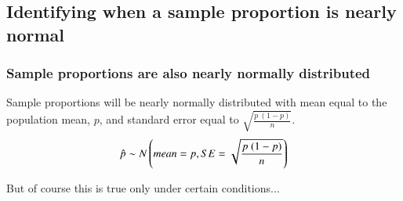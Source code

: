 
\subsection{Identifying when a sample proportion is nearly normal}


\begin{frame}
\frametitle{Sample proportions are also nearly normally distributed}

{
Sample proportions will be nearly normally distributed with mean equal to the population mean, $p$, and standard error equal to $\sqrt{\frac{p~(1-p)}{n}}$.
\[ \hat{p} \sim N \left(  mean = p, SE = \sqrt{\frac{p~(1-p)}{n}}  \right) \]
}

But of course this is true only under certain conditions...



\pause


\end{frame}


%
%
%
%

